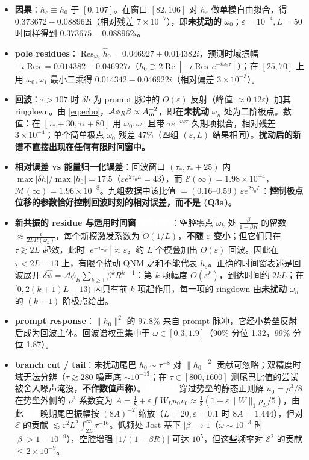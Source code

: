 \documentclass[11pt,a4paper,fontset=windows]{ctexart}
\newcommand{\tagbox}[2]{\begingroup\setlength{\fboxsep}{1.4pt}\colorbox{#1}{\textcolor{white}{\footnotesize\bfseries #2}}\endgroup}
\newcommand{\exactlow}{\tagbox{violet!80!black}{精确低阶}}
\newcommand{\conj}{\tagbox{red!70!black}{猜想}}
\theoremstyle{definition}
\theoremstyle{definition}
\newcommand{\eps}{\varepsilon}
\newcommand{\cE}{\mathcal E}
\newcommand{\cM}{\mathcal M}
\newcommand{\cA}{\mathcal A}
\newcommand{\Ain}{A_{\rm in}}
\renewcommand{\Re}{\operatorname{Re}}
\newcommand{\tauS}{\tau_*}
\begin{document}
\begin{itemize}
\item \textbf{因果}：$h_\eps\equiv h_0$ 于 $[0,107]$。在窗口 $[82,106]$ 对 $h_\eps$ 做单模自由拟合，得 $\bm{0.373672-0.088962i}$（相对残差 $7\times10^{-7}$），即\textbf{未扰动的} $\omega_0$；$\eps=10^{-4},L=50$ 时同样得到 $0.373675-0.088962i$。
\item \textbf{pole residues}：$\operatorname{Res}_{\omega_0}\hat h_0=0.046927+0.014382i$，预测时域振幅 $-i\operatorname{Res}=0.014382-0.046927i$（$h_0\supset2\Re[-i\operatorname{Res}\,e^{-i\omega_0\tau}]$）；在 $[25,70]$ 上用 $\omega_0,\omega_1$ 最小二乘得 $0.014342-0.046922i$（相对偏差 $3\times10^{-3}$）。
\item \textbf{回波}：$\tau>107$ 时 $\delta h$ 为 prompt 脉冲的 $O(\eps)$ 反射（峰值 $\approx0.12\eps$）加其 ringdown。由 \eqref{eq:echo}，$\cA\phi_R\beta\propto\Ain^{-2}$，即在\textbf{未扰动} $\omega_n$ 处为二阶极点。数值：在 $[\tauS+30,\tauS+80]$ 用 $\omega_0,\omega_1$ 且带 $\tau e^{-i\omega\tau}$ 久期项拟合，相对残差 $3\times10^{-4}$；单个简单极点 $\omega_0$ 残差 47\%（四组 $(\eps,L)$ 结果相同）。\textbf{扰动后的新谱不直接出现在任何有限时间窗中。}
\item \textbf{相对误差 vs 能量归一化误差}：回波窗口 $(\tauS,\tauS+25)$ 内 $\max|\delta h|/\max|h_0|=17.5$（$\eps e^{2\gamma_0L}=43$），而 $\cE(\infty)=1.98\times10^{-4}$，$\cM(\infty)=1.96\times10^{-8}$。九组数据中该比值 $=(0.16\text{--}0.59)\,\eps e^{2\gamma_0L}$：\textbf{控制极点位移的参数恰好控制回波时刻的相对误差，而不是 (Q3a)。}
\item \textbf{新共振的 residue 与适用时间窗}\,\exactlow：空腔零点 $\omega_k$ 处 $\frac{\beta}{1-\beta R}$ 的留数 $\approx\frac{i}{2LR(\omega_k)}$，每个新模激发系数为 $O(1/L)$，\textbf{不随 $\eps$ 变小}；但它们只在 $\tau\gtrsim2L$ 起效，此时 $|e^{-i\omega_k\tau}|\approx\eps$，约 $L$ 个模叠加出 $O(\eps)$ 回波。因此在 $\tau<2L-13$ 上，有限个扰动 QNM 之和不能代表 $h_\eps$。正确的时间窗表述是回波展开 $\delta\hat\psi=\cA\phi_R\sum_{k\ge1}\beta^kR^{k-1}$：第 $k$ 项幅度 $O(\eps^k)$，到达时间约 $2kL$；在 $[0,2(k+1)L-13)$ 内只有前 $k$ 项起作用，每一项的 ringdown 由\textbf{未扰动} $\omega_n$ 的 $(k+1)$ 阶极点给出。
\item \textbf{prompt response}：$\|h_0\|^2$ 的 97.8\% 来自 prompt 脉冲，它经小势垒反射后成为回波主体。回波谱权重集中于 $\omega\in[0.3,1.9]$（90\% 分位 1.32，99\% 分位 1.87）。
\item \textbf{branch cut / tail}：未扰动尾巴 $h_0\sim\tau^{-8}$ 对 $\|h_0\|^2$ 贡献可忽略；双精度时域无法分辨（$\tau\gtrsim280$ 噪声底 $\sim10^{-13}$；在 $\tau\in[800,1600]$ 测尾巴比值的尝试被舍入噪声淹没，\textbf{不作数值声称}）。\exactlow\enspace 穿过势垒的静态正则解 $u_0=\rho^3/8$ 在势垒外侧的 $\rho^3$ 系数变为 $A=\tfrac18+\eps\int W_Lu_0v_0\approx\tfrac18(1+\eps\|W\|_1\rho_L/5)$，由此\conj\enspace 晚期尾巴振幅按 $(8A)^{-2}$ 缩放（$L=20,\eps=0.1$ 时 $8A=1.444$），但对 $\cE$ 的贡献 $\lesssim\eps^2L^2\int_{2L}^\infty\tau^{-16}$。低频处 Jost 基下 $|\beta|\to1$（$\omega\sim10^{-3}$ 时 $|\beta|>1-10^{-9}$），空腔增强 $|1/(1-\beta R)|$ 可达 $10^5$，但这些频率对 $\cE^2$ 的贡献 $\le2\times10^{-9}$。
\end{itemize}
\end{document}
